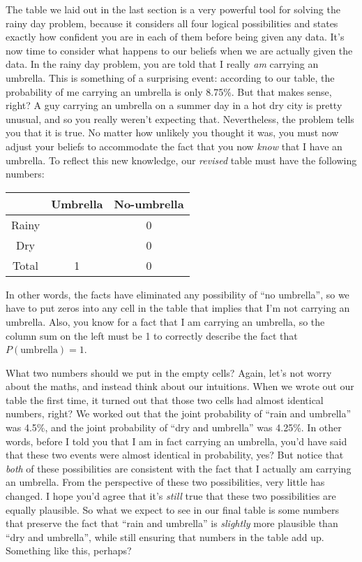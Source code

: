 
The table we laid out in the last section is a very powerful tool for solving the rainy day problem, because it considers all four logical possibilities and states exactly how confident you are in each of them before being given any data. It's now time to consider what happens to our beliefs when we are actually given the data. In the rainy day problem, you are told that I really {\it am} carrying an umbrella. This is something of a surprising event: according to our table, the probability of me carrying an umbrella is only 8.75\%. But that makes sense, right? A guy carrying an umbrella on a summer day in a hot dry city is pretty unusual, and so you really weren't expecting that. Nevertheless, the problem tells you that it is true. No matter how unlikely you thought it was, you must now adjust your beliefs to accommodate the fact that you now {\it know} that I have an umbrella. To reflect this new knowledge, our {\it revised} table must have the following numbers:

\begin{center}
\begin{tabular}{c|cc}
& Umbrella & No-umbrella  \\ \hline
Rainy &  & 0   \\
Dry &  & 0    \\ \hline
Total & 1 & 0 
\end{tabular}
\end{center}

\noindent
In other words, the facts have eliminated any possibility of ``no umbrella'', so we have to put zeros into any cell in the table that implies that I'm not carrying an umbrella. Also, you know for a fact that I am carrying an umbrella, so the column sum on the left must be 1 to correctly describe the fact that $P(\mbox{umbrella})=1$.

What two numbers should we put in the empty cells? Again, let's not worry about the maths, and instead think about our intuitions. When we wrote out our table the first time, it turned out that those two cells had almost identical numbers, right? We worked out that the joint probability of ``rain and umbrella'' was 4.5\%, and the joint probability of ``dry and umbrella'' was 4.25\%. In other words, before I told you that I am in fact carrying an umbrella, you'd have said that these two events were almost identical in probability, yes? But notice that {\it both} of these possibilities are consistent with the fact that I actually am carrying an umbrella. From the perspective of these two possibilities, very little has changed. I hope you'd agree that it's {\it still} true that these two possibilities are equally plausible. So what we expect to see in our final table is some numbers that preserve the fact that ``rain and umbrella'' is {\it slightly} more plausible than ``dry and umbrella'', while still ensuring that numbers in the table add up. Something like this, perhaps?


